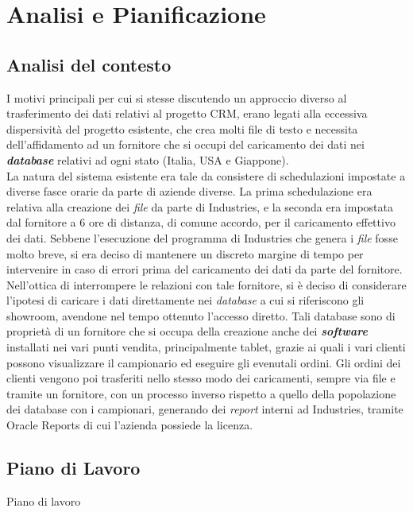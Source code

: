 \section{Analisi e Pianificazione}
\subsection{Analisi del contesto}
I motivi principali per cui si stesse discutendo un approccio diverso al trasferimento dei dati relativi al progetto CRM, erano legati alla eccessiva dispersività del progetto esistente, che crea molti file di testo e necessita dell'affidamento ad un fornitore che si occupi del caricamento dei dati nei \textit{\textbf{database}} relativi ad ogni stato (Italia, USA e Giappone).\\
La natura del sistema esistente era tale da consistere di schedulazioni impostate a diverse fasce orarie da parte di aziende diverse. La prima schedulazione era relativa alla creazione dei \textit{file} da parte di Industries, e la seconda era impostata dal fornitore a 6 ore di distanza, di comune accordo, per il caricamento effettivo dei dati. Sebbene l'esecuzione del programma di Industries che genera i \textit{file} fosse molto breve, si era deciso di mantenere un discreto margine di tempo per intervenire in caso di errori prima del caricamento dei dati da parte del fornitore.\\
Nell'ottica di interrompere le relazioni con tale fornitore, si è deciso di considerare l'ipotesi di caricare i dati direttamente nei \textit{database} a cui si riferiscono gli showroom, avendone nel tempo ottenuto l'accesso diretto. Tali database sono di proprietà di un fornitore che si occupa della creazione anche dei \textit{\textbf{software}} installati nei vari punti vendita, principalmente tablet, grazie ai quali i vari clienti possono visualizzare il campionario ed eseguire gli evenutali ordini. Gli ordini dei clienti vengono poi trasferiti nello stesso modo dei caricamenti, sempre via file e tramite un fornitore, con un processo inverso rispetto a quello della popolazione dei database con i campionari, generando dei \textit{report} interni ad Industries, tramite Oracle Reports di cui l'azienda possiede la licenza.

\subsection{Piano di Lavoro}
 Piano di lavoro


